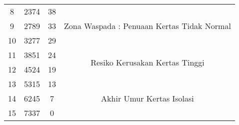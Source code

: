 \documentclass{article}
\begin{document}
\begin{table}
\begin{tabular}{|c|c|c|c|}
\hline
8           & 2374                                                                             & 38                                                                                     & \multirow{3}{*}{Zona Waspada : Penuaan Kertas Tidak Normal}  \\ 
\cline{1-3}
9           & 2789                                                                             & 33                                                                                     &                                                              \\ 
\cline{1-3}
10          & 3277                                                                             & 29                                                                                     &                                                              \\ 
\hline
11          & 3851                                                                             & 24                                                                                     & \multirow{2}{*}{Resiko Kerusakan  Kertas Tinggi}             \\ 
\cline{1-3}
12          & 4524                                                                             & 19                                                                                     &                                                              \\ 
\hline
13          & 5315                                                                             & 13                                                                                     & \multirow{3}{*}{Akhir Umur Kertas Isolasi}                   \\ 
\cline{1-3}
14          & 6245                                                                             & 7                                                                                      &                                                              \\ 
\cline{1-3}
15          & 7337                                                                             & 0                                                                                      &                                                              \\
\hline
\end{tabular}
\end{table}
\end{document}
